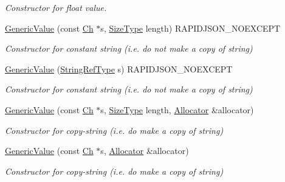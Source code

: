 \begin{DoxyCompactItemize}
\begin{DoxyCompactList}\small\item\em Constructor for float value. \end{DoxyCompactList}\item 
\mbox{\hyperlink{classrapidjson_1_1_generic_value_a51e93a4fb57f77a39767acb076bf43c1}{Generic\+Value}} (const \mbox{\hyperlink{classrapidjson_1_1_generic_value_adcdbc7fa85a9a41b78966d7e0dcc2ac4}{Ch}} $\ast$s, \mbox{\hyperlink{namespacerapidjson_a44eb33eaa523e36d466b1ced64b85c84}{Size\+Type}} length) R\+A\+P\+I\+D\+J\+S\+O\+N\+\_\+\+N\+O\+E\+X\+C\+E\+PT
\begin{DoxyCompactList}\small\item\em Constructor for constant string (i.\+e. do not make a copy of string) \end{DoxyCompactList}\item 
\mbox{\hyperlink{classrapidjson_1_1_generic_value_a65bfc3073fa80ee5eba8e985abe2f941}{Generic\+Value}} (\mbox{\hyperlink{classrapidjson_1_1_generic_value_a559eb9cea54364a35518b02f6d74f379}{String\+Ref\+Type}} s) R\+A\+P\+I\+D\+J\+S\+O\+N\+\_\+\+N\+O\+E\+X\+C\+E\+PT
\begin{DoxyCompactList}\small\item\em Constructor for constant string (i.\+e. do not make a copy of string) \end{DoxyCompactList}\item 
\mbox{\hyperlink{classrapidjson_1_1_generic_value_ad9553bb9ccbfd19547c473a95405a8b2}{Generic\+Value}} (const \mbox{\hyperlink{classrapidjson_1_1_generic_value_adcdbc7fa85a9a41b78966d7e0dcc2ac4}{Ch}} $\ast$s, \mbox{\hyperlink{namespacerapidjson_a44eb33eaa523e36d466b1ced64b85c84}{Size\+Type}} length, \mbox{\hyperlink{classrapidjson_1_1_allocator}{Allocator}} \&allocator)
\begin{DoxyCompactList}\small\item\em Constructor for copy-\/string (i.\+e. do make a copy of string) \end{DoxyCompactList}\item 
\mbox{\hyperlink{classrapidjson_1_1_generic_value_a83ba61e8a5170c2e172fd60ebc11016f}{Generic\+Value}} (const \mbox{\hyperlink{classrapidjson_1_1_generic_value_adcdbc7fa85a9a41b78966d7e0dcc2ac4}{Ch}} $\ast$s, \mbox{\hyperlink{classrapidjson_1_1_allocator}{Allocator}} \&allocator)
\begin{DoxyCompactList}\small\item\em Constructor for copy-\/string (i.\+e. do make a copy of string) \end{DoxyCompactList}\item 

\end{DoxyCompactItemize}
